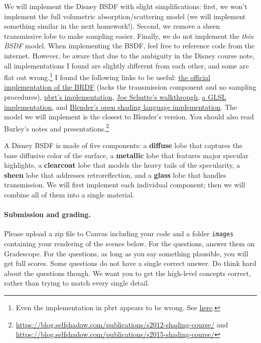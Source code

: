 We will implement the Disney BSDF with slight simplifications: first, we won't implement the full volumetric absorption/scattering model (we will implement something similar in the next homework!). Second, we remove a sheen transmissive lobe to make sampling easier. Finally, we do not implement the \emph{thin BSDF} model. When implementing the BSDF, feel free to reference code from the internet. However, be aware that due to the ambiguity in the Disney course note, all implementations I found are slightly different from each other, and some are flat out wrong.\footnote{Even the implementation in pbrt appears to be wrong. See \href{https://github.com/mmp/pbrt-v3/issues/313}{here}.} I found the following links to be useful: \href{https://github.com/wdas/brdf/blob/main/src/brdfs/disney.brdf}{the official implementation of the BRDF} (lacks the transmission component and no sampling procedures), \href{https://github.com/mmp/pbrt-v3/blob/master/src/materials/disney.cpp}{pbrt's implementation}, \href{https://schuttejoe.github.io/post/disneybsdf/}{Joe Schutte's walkthrough}, \href{https://github.com/knightcrawler25/GLSL-PathTracer/blob/master/src/shaders/common/disney.glsl}{a GLSL implementation}, and \href{https://github.com/dfelinto/blender/blob/master/intern/cycles/kernel/shaders/node_principled_bsdf.osl}{Blender's open shading language implementation}. The model we will implement is the closest to Blender's version. You should also read Burley's notes and presentations.\footnote{\url{https://blog.selfshadow.com/publications/s2012-shading-course/} and \url{https://blog.selfshadow.com/publications/s2015-shading-course/}}

A Disney BSDF is made of five components: a \textbf{diffuse} lobe that captures the base diffusive color of the surface, a \textbf{metallic} lobe that features major specular highlights, a \textbf{clearcoat} lobe that models the heavy tails of the specularity, a \textbf{sheen} lobe that addresses retroreflection, and a \textbf{glass} lobe that handles transmission. We will first implement each individual component; then we will combine all of them into a single material. 

\paragraph{Submission and grading.} 
Please upload a zip file to Canvas including your code and a folder \lstinline{images} containing your rendering of the scenes below. For the questions, answer them on Gradescope.
For the questions, as long as you say something plausible, you will get full scores.
Some questions do not have a single correct answer.
Do think hard about the questions though. We want you to get the high-level concepts correct, rather than trying to match every single detail.

